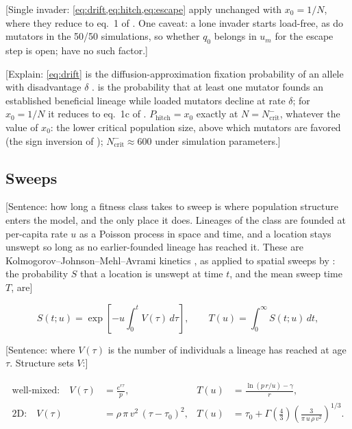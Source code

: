 [Single invader: \cref{eq:drift,eq:hitch,eq:escape} apply unchanged with $x_0 = 1/N$, where they reduce to eq.\ 1 of \citet{raynes2018sign}. One caveat: a lone invader starts load-free, as do mutators in the 50/50 simulations, so whether $q_0$ belongs in $u_m$ for the escape step is open; \citet{raynes2018sign} have no such factor.]

[Explain: \cref{eq:drift} is the diffusion-approximation fixation probability of an allele with disadvantage $\delta$ \citep{kimura1962probability}.
 is the probability that at least one mutator founds an established beneficial lineage while loaded mutators decline at rate $\delta$; for $x_0 = 1/N$ it reduces to eq.\ 1c of \citet{raynes2018sign}.
$P_\mathrm{hitch} = x_0$ exactly at $N = N_\mathrm{crit}^{-}$, whatever the value of $x_0$: the lower critical population size, above which mutators are favored (the sign inversion of \citet{raynes2018sign}); $N_\mathrm{crit}^{-} \approx 600$ under simulation parameters.]

\subsection{Sweeps} \label{sec:model:sweep}

[Sentence: how long a fitness class takes to sweep is where population structure enters the model, and the only place it does.
Lineages of the class are founded at per-capita rate $u$ as a Poisson process in space and time, and a location stays unswept so long as no earlier-founded lineage has reached it.
These are Kolmogorov--Johnson--Mehl--Avrami kinetics \citep{kolmogorov1937statistical,avrami1939kinetics}, as applied to spatial sweeps by \citet{ralph2010parallel,martens2011interfering}: the probability $S$ that a location is unswept at time $t$, and the mean sweep time $T$, are]

\begin{equation}
  S(t; u) = \exp\!\left[-u \int_0^t V(\tau)\, d\tau\right],
  \qquad
  T(u) = \int_0^\infty S(t; u)\, dt, \label{eq:unswept}
\end{equation}

[Sentence: where $V(\tau)$ is the number of individuals a lineage has reached at age $\tau$. Structure sets $V$:]

\begin{align}
  \text{well-mixed:} \quad V(\tau) &= \frac{e^{r \tau}}{p},
  & T(u) &= \frac{\ln(p\, r / u) - \gamma}{r}, \label{eq:sweep-mixed} \\
  \text{2D:} \quad V(\tau) &= \rho\, \pi\, v^2\, (\tau - \tau_0)^2,
  & T(u) &= \tau_0 + \Gamma\!\left(\tfrac{4}{3}\right) \left(\frac{3}{\pi\, u\, \rho\, v^2}\right)^{1/3}. \label{eq:sweep-2d}
\end{align}

